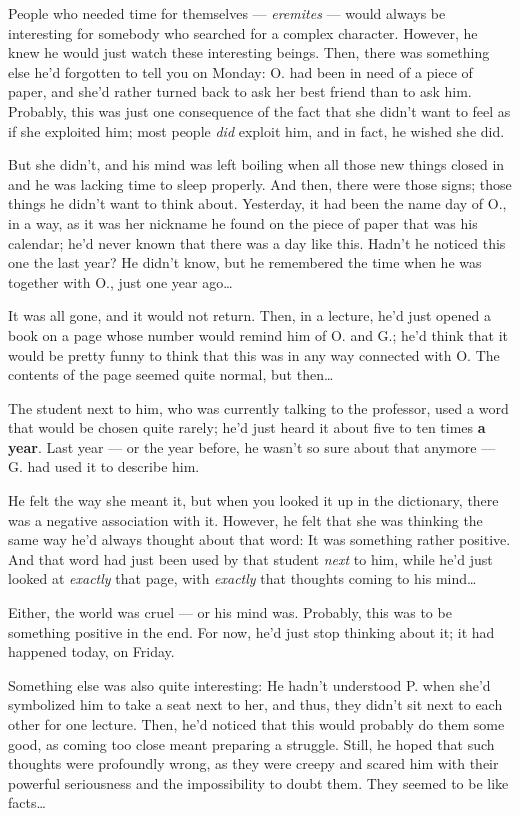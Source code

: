 People who needed time for themselves --- \emph{eremites} --- would always be interesting for somebody who searched for a complex character. However, he knew he would just watch these interesting beings. 
Then, there was something else he'd forgotten to tell you on Monday: O. had been in need of a piece of paper, and she'd rather turned back to ask her best friend than to ask him. 
Probably, this was just one consequence of the fact that she didn't want to feel as if she exploited him; most people \emph{did} exploit him, and in fact, he wished she did.

But she didn't, and his mind was left boiling when all those new things closed in and he was lacking time to sleep properly. And then, there were those signs; those things he didn't want to think about. 
Yesterday, it had been the name day of O., in a way, as it was her nickname he found on the piece of paper that was his calendar; he'd never known that there was a day like this. Hadn't he noticed this one the last year? He didn't know, but he remembered the time when he was together with O., just one year ago\dots{}

It was all gone, and it would not return. Then, in a lecture, he'd just opened a book on a page whose number would remind him of O. and G.; he'd think that it would be pretty funny to think that this was in any way connected with O. The contents of the page seemed quite normal, but then\dots{}

The student next to him, who was currently talking to the professor, used a word that would be chosen quite rarely; he'd just heard it about five to ten times \textbf{a year}. Last year --- or the year before, he wasn't so sure about that anymore --- G. had used it to describe him.

He felt the way she meant it, but when you looked it up in the dictionary, there was a negative association with it. However, he felt that she was thinking the same way he'd always thought about that word: It was something rather positive. And that word had just been used by that student \emph{next} to him, while he'd just looked at \emph{exactly} that page, with \emph{exactly} that thoughts coming to his mind\dots{}

Either, the world was cruel --- or his mind was. Probably, this was to be something positive in the end. For now, he'd just stop thinking about it; it had happened today, on Friday.

Something else was also quite interesting: He hadn't understood P. when she'd symbolized him to take a seat next to her, and thus, they didn't sit next to each other for one lecture. Then, he'd noticed that this would probably do them some good, as coming too close meant preparing a struggle. Still, he hoped that such thoughts were profoundly wrong, as they were creepy and scared him with their powerful seriousness and the impossibility to doubt them. They seemed to be like facts\dots{}

